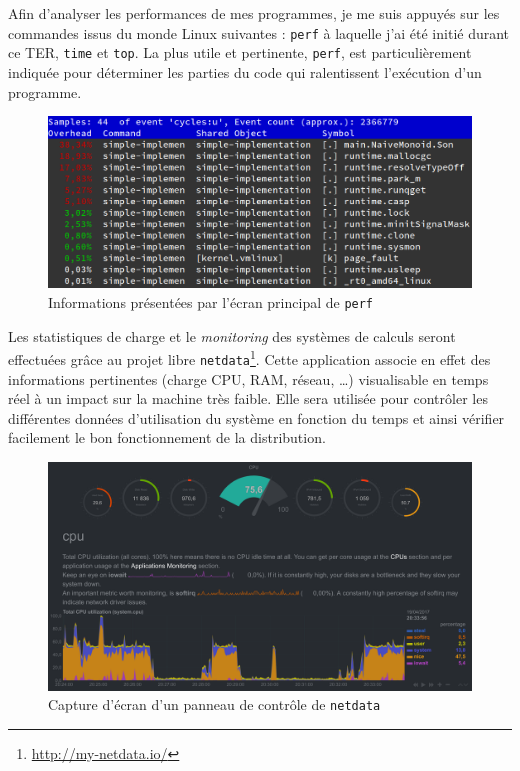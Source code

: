 \documentclass[12pt,a4paper]{report}
\begin{document}
Afin d'analyser les performances de mes programmes, je me suis appuyés sur les commandes issus du monde Linux suivantes : \texttt{perf} à laquelle j'ai été initié durant ce TER, \texttt{time} et \texttt{top}. La plus utile et pertinente, \texttt{perf}, est particulièrement indiquée pour déterminer les parties du code qui ralentissent l'exécution d'un programme.

\begin{figure}[h]
	\centering
	\includegraphics[scale=0.35]{perf.png}
	\caption{Informations présentées par l'écran principal de \texttt{perf}}
\end{figure}

Les statistiques de charge et le \emph{monitoring} des systèmes de calculs seront effectuées grâce au projet libre \texttt{netdata}\footnote{\url{http://my-netdata.io/}}. Cette application associe en effet des informations pertinentes (charge CPU, RAM, réseau, \dots) visualisable en temps réel à un impact sur la machine très faible. Elle sera utilisée pour contrôler les différentes données d'utilisation du système en fonction du temps et ainsi vérifier facilement le bon fonctionnement de la distribution.

\begin{figure}[h]
	\centering
	\includegraphics[scale=0.125]{netdata.png}
	\caption{Capture d'écran d'un panneau de contrôle de \texttt{netdata}}
\end{figure}
\end{document}
